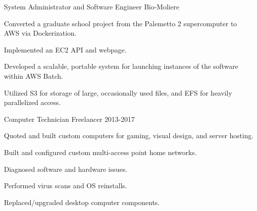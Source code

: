 

\begin{cventries}

  
  \cventry
    {System Administrator and Software Engineer} %
    {Bio-Moliere} %
    {} %
    {} %
    {
      \begin{cvitems} %
        \item {Converted a graduate school project from the Palemetto 2 supercomputer to AWS via Dockerization.}
        \item {Implemented an EC2 API and webpage.}
        \item {Developed a scalable, portable system for launching instances of the software within AWS Batch.}
        \item {Utilized S3 for storage of large, occasionally used files, and EFS for heavily parallelized access.}
      \end{cvitems}
    }
    
  \cventry
    {Computer Technician}
    {Freelancer}
    {}
    {2013-2017}
    {
      \begin{cvitems}
        \item{Quoted and built custom computers for gaming, visual design, and server hosting.}%
        \item{Built and configured custom multi-access point home networks.}
        \item{Diagnosed software and hardware issues.}
        \item{Performed virus scans and OS reinstalls.}
        \item{Replaced/upgraded desktop computer components.}
      \end{cvitems}
    }

\end{cventries}
